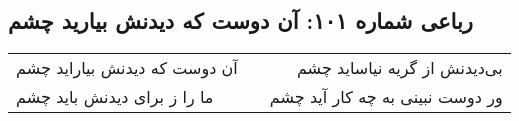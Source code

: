 \begin{center}
\section*{رباعی شماره ۱۰۱: آن دوست که دیدنش بیارید چشم}
\label{sec:101}
\begin{longtable}{l p{0.5cm} r}
آن دوست که دیدنش بیاراید چشم
&&
بی‌دیدنش از گریه نیاساید چشم
\\
ما را ز برای دیدنش باید چشم
&&
ور دوست نبینی به چه کار آید چشم
\\
\end{longtable}
\end{center}
